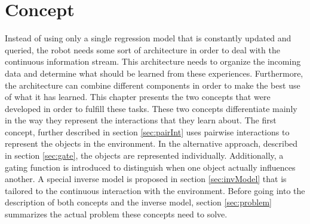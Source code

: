 \chapter{Concept \label{chap:concept}}



Instead of using only a single regression model that is constantly updated and queried, the robot needs some sort of architecture in order to deal with the continuous information stream. This architecture needs to organize the incoming data and determine what should be learned from these experiences. Furthermore, the architecture can combine different components in order to make the best use of what it has learned. 
This chapter presents the two concepts that were developed in order to fulfill these tasks. These two concepts differentiate mainly in the way they represent the interactions that they learn about. The first concept, further described in section \ref{sec:pairInt} uses pairwise interactions to represent the objects in the environment. In the alternative approach, described in section \ref{sec:gate}, the objects are represented individually. Additionally, a gating function is introduced to distinguish when one object actually influences another. 
A special inverse model is proposed in section \ref{sec:invModel} that is tailored to the continuous interaction with the environment. %
Before going into the description of both concepts and the inverse model, section \ref{sec:problem} summarizes the actual problem these concepts need to solve. 

%

